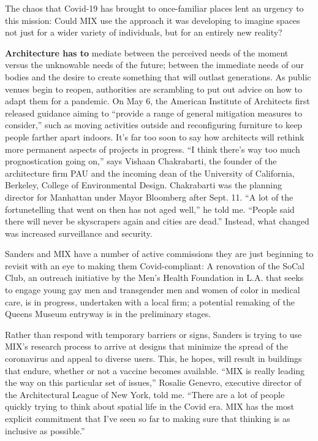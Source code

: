 The chaos that Covid-19 has brought to once-familiar places lent an
urgency to this mission: Could MIX use the approach it was developing to
imagine spaces not just for a wider variety of individuals, but for an
entirely new reality?

\textbf{Architecture has to} mediate between the perceived needs of the
moment versus the unknowable needs of the future; between the immediate
needs of our bodies and the desire to create something that will outlast
generations. As public venues begin to reopen, authorities are
scrambling to put out advice on how to adapt them for a pandemic. On May
6, the American Institute of Architects first released guidance aiming
to ``provide a range of general mitigation measures to consider,'' such
as moving activities outside and reconfiguring furniture to keep people
farther apart indoors. It's far too soon to say how architects will
rethink more permanent aspects of projects in progress. ``I think
there's way too much prognostication going on,'' says Vishaan
Chakrabarti, the founder of the architecture firm PAU and the incoming
dean of the University of California, Berkeley, College of Environmental
Design. Chakrabarti was the planning director for Manhattan under Mayor
Bloomberg after Sept. 11. ``A lot of the fortunetelling that went on
then has not aged well,'' he told me. ``People said there will never be
skyscrapers again and cities are dead.'' Instead, what changed was
increased surveillance and security.

Sanders and MIX have a number of active commissions they are just
beginning to revisit with an eye to making them Covid-compliant: A
renovation of the SoCal Club, an outreach initiative by the Men's Health
Foundation in L.A. that seeks to engage young gay men and transgender
men and women of color in medical care, is in progress, undertaken with
a local firm; a potential remaking of the Queens Museum entryway is in
the preliminary stages.

Rather than respond with temporary barriers or signs, Sanders is trying
to use MIX's research process to arrive at designs that minimize the
spread of the coronavirus and appeal to diverse users. This, he hopes,
will result in buildings that endure, whether or not a vaccine becomes
available. ``MIX is really leading the way on this particular set of
issues,'' Rosalie Genevro, executive director of the Architectural
League of New York, told me. ``There are a lot of people quickly trying
to think about spatial life in the Covid era. MIX has the most explicit
commitment that I've seen so far to making sure that thinking is as
inclusive as possible.''

